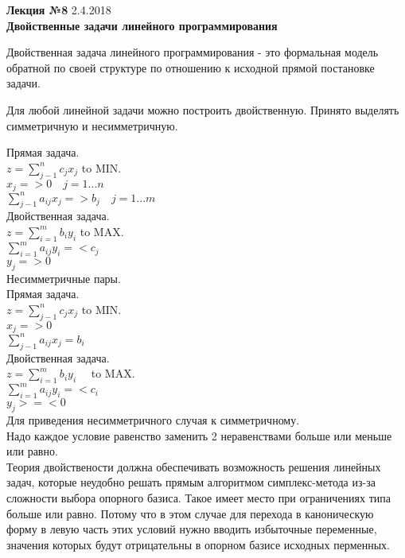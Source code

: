 \LARGE{ \textbf {Лекция №8} 2.4.2018}\\
\Large{ \textbf {Двойственные задачи линейного программирования}}

Двойственная задача линейного программирования - это формальная модель обратной по своей структуре
по отношению к исходной прямой постановке задачи.

Для любой линейной задачи можно построить двойственную.
Принято выделять симметричную и несимметричную.

\Large{Прямая задача.}\\
$z = \sum \limits_{j-1}^n c_j x_j $ to MIN.\\
$x_j => 0 \quad j=1...n$\\
$ \sum \limits_{j-1}^n a_{ij} x_j => b_j  \quad j=1...m $\\



\Large{Двойственная задача.}\\
$z = \sum \limits_{i=1}^m b_i y_i $ to MAX.\\
$ \sum \limits_{i=1}^m a_{ij} y_i =< c_j $\\
$y_j => 0 $\\

\Large{Несимметричные пары.}\\
\Large{Прямая задача.}\\
$z = \sum \limits_{j-1}^n c_j x_j $ to MIN.\\
$x_j => 0$\\
$ \sum \limits_{j-1}^n a_{ij} x_j = b_i $\\


\Large{Двойственная задача.}\\
$z = \sum \limits_{i=1}^m b_i y_i \quad $ to MAX.\\
$ \sum \limits_{i=1}^m a_{ij} y_i =< c_i $\\
$y_j >=< 0 $\\

Для приведения несимметричного случая к симметричному.\\
Надо каждое условие равенство заменить 2 неравенствами больше или меньше или равно.\\

Теория двойствености должна обеспечивать возможность решения линейных задач, которые неудобно решать прямым алгоритмом симплекс-метода
из-за сложности выбора опорного базиса. Такое имеет место при ограничениях типа больше или равно.
Потому что в этом случае для перехода в каноническую форму в левую часть этих условий нужно вводить избыточные переменные,
значения которых будут отрицательны в опорном базисе исходных перменных.

